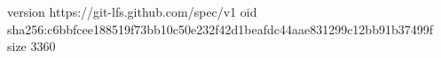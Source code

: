 version https://git-lfs.github.com/spec/v1
oid sha256:c6bbfcee188519f73bb10c50e232f42d1beafdc44aae831299c12bb91b37499f
size 3360
